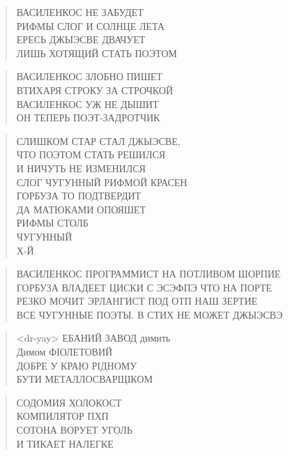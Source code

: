 \poemtitle{***}
\begin{verse}
ВАСИЛЕНКОС НЕ ЗАБУДЕТ\\
РИФМЫ СЛОГ И СОЛНЦЕ ЛЕТА\\
ЕРЕСЬ ДЖЫЭСВЕ ДВАЧУЕТ\\
ЛИШЬ ХОТЯЩИЙ СТАТЬ ПОЭТОМ
\end{verse}

\poemtitle{***}
\begin{verse}
ВАСИЛЕНКОС ЗЛОБНО ПИШЕТ\\
ВТИХАРЯ СТРОКУ ЗА СТРОЧКОЙ\\
ВАСИЛЕНКОС УЖ НЕ ДЫШИТ\\
ОН ТЕПЕРЬ ПОЭТ-ЗАДРОТЧИК
\end{verse}

\poemtitle{***}
\begin{verse}
СЛИШКОМ СТАР СТАЛ ДЖЫЭСВЕ, \\
ЧТО ПОЭТОМ СТАТЬ РЕШИЛСЯ\\
И НИЧУТЬ НЕ ИЗМЕНИЛСЯ\\
СЛОГ ЧУГУННЫЙ РИФМОЙ КРАСЕН\\
ГОРБУЗА ТО ПОДТВЕРДИТ\\
ДА МАТЮКАМИ ОПОЯШЕТ\\
РИФМЫ СТОЛБ \\
ЧУГУННЫЙ\\
Х-Й
\end{verse}

\poemtitle{***}
\begin{verse}
ВАСИЛЕНКОС ПРОГРАММИСТ НА ПОТЛИВОМ ШОРПИЕ\\
ГОРБУЗА ВЛАДЕЕТ ЦИСКИ С ЭСЭФПЭ ЧТО НА ПОРТЕ\\
РЕЗКО МОЧИТ ЭРЛАНГИСТ ПОД ОТП НАШ ЗЕРТИЕ\\
ВСЕ ЧУГУННЫЕ ПОЭТЫ. В СТИХ НЕ МОЖЕТ ДЖЫЭСВЭ
\end{verse}

\poemtitle{***}
\begin{verse}
<dr-yay> ЕБАНИЙ ЗАВОД димить\\
Димом ФІОЛЕТОВИЙ\\
ДОБРЕ У КРАЮ РІДНОМУ\\
БУТИ МЕТАЛЛОСВАРЩІКОМ
\end{verse}

\poemtitle{***}
\begin{verse}
СОДОМИЯ ХОЛОКОСТ\\
КОМПИЛЯТОР ПХП\\
СОТОНА ВОРУЕТ УГОЛЬ\\
И ТИКАЕТ НАЛЕГКЕ
\end{verse}

